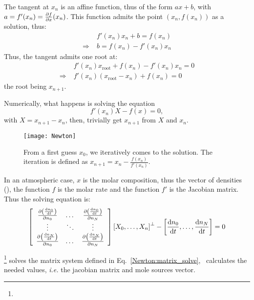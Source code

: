 The tangent at $x_n$ is an affine function, thus of the form
$ax + b$, with $a = f'(x_n) = \frac{\partial f}{\partial x}(x_n)$. This function
admits the point $(x_n,f(x_n))$ as a solution, thus:
\begin{equation}
\begin{split}
              & f'(x_n) x_n + b = f(x_n) \\
\Rightarrow\; & b = f(x_n) - f'(x_n) x_n
\end{split}
\label{Newton:tangent}
\end{equation}
Thus, the tangent admits one root at:
\begin{equation}
\begin{split}
              & f'(x_n) x_\text{root} + f(x_n) - f'(x_n) x_n = 0 \\
\Rightarrow\; & f'(x_n) \left(x_\text{root} - x_n \right) + f(x_n) = 0
\end{split}
\label{Newton:tangent:root}
\end{equation}
the root being $x_{n+1}$.

Numerically, what happens is solving the equation
\begin{equation}
f'(x_n)X - f(x) = 0,
\label{Newton:solving}
\end{equation}
with $X = x_{n+1} - x_n$, then, trivially get $x_{n+1}$ from
$X$ and $x_n$.
\begin{figure}
\centering
\texttt{[image: Newton]}
\caption{\label{Newton:solve}From a first guess $x_0$, we iteratively
comes to the solution. The iteration is defined as $x_{n+1} = x_n - \frac{f(x_n)}{f'(x_n)}$.}
\end{figure}

In an atmospheric case, $x$ is the molar composition, thus the
vector of densities (), 
the function $f$ is the molar rate 
and the function $f'$ is the Jacobian matrix. Thus
the solving equation is:
\begin{equation}
\left[
\begin{array}{ccc}
\frac{\partial\left(\frac{\mathrm{d} n_0}{\mathrm{d} t}\right)}{\partial n_0} & \dots  & \frac{\partial\left(\frac{\mathrm{d} n_0}{\mathrm{d} t}\right)}{\partial n_N} \\
 \vdots                             & \ddots & \vdots \\
\frac{\partial\left(\frac{\mathrm{d} n_N}{\mathrm{d} t}\right)}{\partial n_0} & \dots  & \frac{\partial\left(\frac{\mathrm{d} n_N}{\mathrm{d} t}\right)}{\partial n_N} \\
\end{array}
\right] 
\left[X_0,\dots,X_n\right]^{\perp} - \left[\frac{\mathrm{d} n_0}{\mathrm{d} t},\dots,\frac{\mathrm{d} n_N}{\mathrm{d} t}\right] = 0
\label{Newton:matrix_solve}
\end{equation}

\Eigen\footnote{\EigenTux} solves the matrix system defined in Eq.~\ref{Newton:matrix_solve}, \PINC\ calculates
the needed values, \textit{i.e.} the jacobian matrix and mole sources vector.
